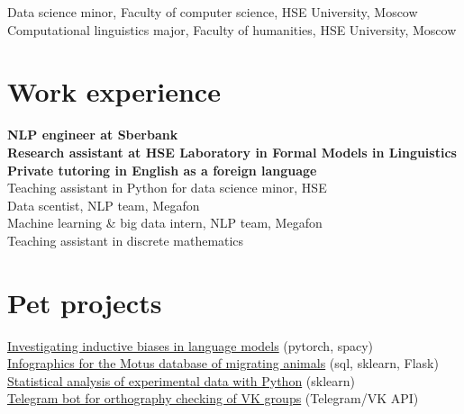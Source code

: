 \documentclass[11pt]{article} %
\begin{document}
 Data science minor, Faculty of computer science, HSE University, Moscow\\
 Computational linguistics major, Faculty of humanities, HSE University, Moscow


\section*{Work experience}

 \textbf{NLP engineer at Sberbank}\\
 \textbf{Research assistant at HSE Laboratory in Formal Models in Linguistics}\\
 \textbf{Private tutoring in English as a foreign language}\\
 Teaching assistant in Python for data science minor, HSE\\
 Data scentist, NLP team, Megafon\\
 {Machine learning \& big data intern, NLP team, Megafon}\\
Teaching assistant in discrete mathematics



\section*{Pet projects}

\href{https://github.com/thddbptnsndshs/LMindbiases}{Investigating inductive biases in language models} (pytorch, spacy)\\
\href{https://github.com/thddbptnsndshs/motustoday}{Infographics for the Motus database of migrating animals} (sql, sklearn, Flask)\\
\href{https://github.com/thddbptnsndshs/idioms}{Statistical analysis of experimental data with Python} (sklearn)\\
\href{https://github.com/thddbptnsndshs/nlzlkskprdstvtljsclnhgrppncnvfrmvgrppvk}{Telegram bot for orthography checking of VK groups} (Telegram/VK API)\\
\end{document}
